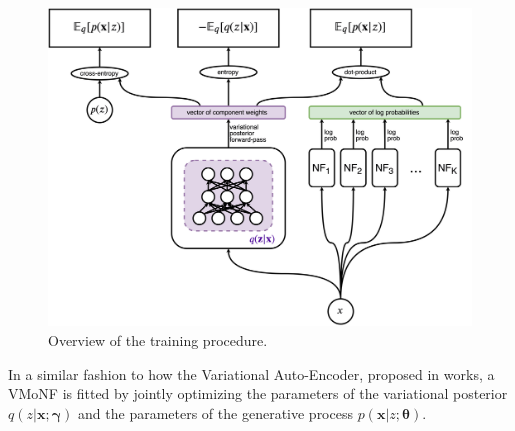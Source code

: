 \begin{figure}[!htb]
  \centering
  \includegraphics[width=0.85\linewidth]{figures/train_overview.png}
  \caption{Overview of the training procedure.}
  \label{fig:modeloverview}
\end{figure}

In a similar fashion to how the Variational Auto-Encoder, proposed in \cite{vaepaper}
works, a VMoNF is fitted by jointly optimizing the parameters of the variational
posterior $q(z|\bm{x}; \bm\gamma)$ and the parameters of the generative process
$p(\bm{x}|z; \bm\theta)$.
